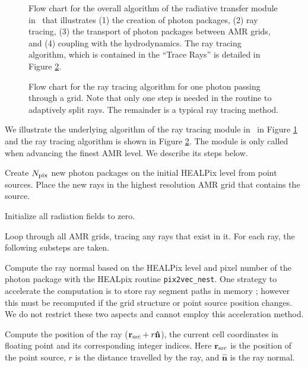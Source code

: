 \documentclass[apj,onecolumn]{emulateapj}
\begin{document}
\begin{figure}[t]
  \caption{\label{fig:MainAlgorithm} Flow chart for the overall
    algorithm of the radiative transfer module in \enzo~that
    illustrates (1) the creation of photon packages, (2) ray tracing,
    (3) the transport of photon packages between AMR grids, and (4)
    coupling with the hydrodynamics.  The ray tracing algorithm, which
    is contained in the ``Trace Rays'' is detailed in Figure
    \ref{fig:RTalgorithm}.}
\end{figure}

\begin{figure}[t]
  \caption{\label{fig:RTalgorithm} Flow chart for the ray tracing
    algorithm for one photon passing through a grid.  Note that only
    one step is needed in the routine to adaptively split rays.  The
    remainder is a typical ray tracing method.}
\end{figure}

We illustrate the underlying algorithm of the ray tracing module in
\enzo~in Figure \ref{fig:MainAlgorithm} and the ray tracing algorithm
is shown in Figure \ref{fig:RTalgorithm}.  The module is only called
when advancing the finest AMR level.  We describe its steps below.

 Create $N_{\rm pix}$ new photon packages on the initial
HEALPix level from point sources.  Place the new rays in the highest
resolution AMR grid that contains the source.

 Initialize all radiation fields to zero.

 Loop through all AMR grids, tracing any rays that exist in
it.  For each ray, the following substeps are taken.

 Compute the ray normal based on the HEALPix level and pixel
number of the photon package with the HEALpix routine
\texttt{pix2vec\_nest}.  One strategy to accelerate the computation is
to store ray segment paths in memory \citep{Abel02_RT,
  Krumholz07_ART}; however this must be recomputed if the grid
structure or point source position changes.  We do not restrict these
two aspects and cannot employ this acceleration method.

 Compute the position of the ray ($\mathbf{r}_{\rm src} + r
\mathbf{\hat{n}}$), the current cell coordinates in floating point and
its corresponding integer indices.  Here $\mathbf{r}_{\rm src}$ is the
position of the point source, $r$ is the distance travelled by the
ray, and $\mathbf{\hat{n}}$ is the ray normal.
\end{document}
